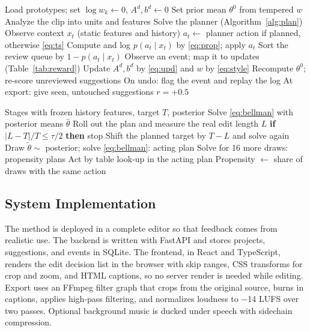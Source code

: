 \documentclass{ieeeaccess}
\begin{document}
\begin{algorithm}[t]
\caption{Online Editing Agent for One Creator}
\label{alg:main}
\begin{algorithmic}[1]
\small
\STATE Load prototypes; set $\log w_k \leftarrow 0$, $A^{d},b^{d}\leftarrow 0$
\STATE Set prior mean $\theta^{0}$ from tempered $w$
\STATE Analyze the clip into units and features
\STATE Solve the planner (Algorithm~\ref{alg:plan})
\ENDIF
{}
\STATE Observe context $x_t$ (static features and history)
\STATE $a_t\leftarrow$ planner action if planned, otherwise \eqref{eq:ts}
\STATE Compute and log $p(a_t\mid x_t)$ by \eqref{eq:prop}; apply $a_t$
\ENDFOR
\STATE Sort the review queue by $1-p(a_t\mid x_t)$
\STATE Observe an event; map it to updates (Table~\ref{tab:reward})
\STATE Update $A^{d},b^{d}$ by \eqref{eq:upd} and $w$ by \eqref{eq:style}
\STATE Recompute $\theta^{0}$; re-score unreviewed suggestions
\STATE On undo: flag the event and replay the log
\ENDWHILE
\STATE At export: give seen, untouched suggestions $r=+0.5$
\ENDFOR
\end{algorithmic}
\end{algorithm}

\begin{algorithm}[t]
\caption{Target-Length Planner with Posterior Sampling}
\label{alg:plan}
\begin{algorithmic}[1]
\small
\REQUIRE Stages with frozen history features, target $T$, posterior
\STATE Solve \eqref{eq:bellman} with posterior means $\hat\theta$
\STATE Roll out the plan and measure the real edit length $L$
\STATE \textbf{if} $|L-T|/T \leq \tau/2$ \textbf{then} stop
\STATE Shift the planned target by $T-L$ and solve again
\ENDFOR
\STATE Draw $\tilde\theta\sim$ posterior; solve \eqref{eq:bellman}: acting plan
\STATE Solve for 16 more draws: propensity plans
\STATE Act by table look-up in the acting plan
\STATE Propensity $\leftarrow$ share of draws with the same action
\ENDFOR
\end{algorithmic}
\end{algorithm}

\subsection{System Implementation}
The method is deployed in a complete editor so that feedback comes from realistic use. The backend is written with FastAPI and stores projects, suggestions, and events in SQLite. The frontend, in React and TypeScript, renders the edit decision list in the browser with skip ranges, CSS transforms for crop and zoom, and HTML captions, so no server render is needed while editing. Export uses an FFmpeg filter graph that crops from the original source, burns in captions, applies high-pass filtering, and normalizes loudness to $-$14 LUFS over two passes. Optional background music is ducked under speech with sidechain compression.
\end{document}
